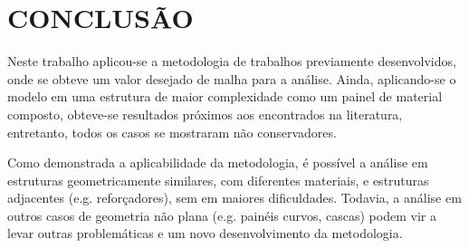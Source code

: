 
\section{CONCLUSÃO}

Neste trabalho aplicou-se a metodologia de trabalhos previamente 
desenvolvidos, onde se obteve um valor desejado de malha para a 
análise.
Ainda, aplicando-se o modelo em uma estrutura de maior complexidade 
como um painel de material composto, obteve-se resultados próximos aos 
encontrados na literatura, entretanto, todos os casos se mostraram não 
conservadores.

Como demonstrada a aplicabilidade da metodologia, é possível a análise em estruturas geometricamente similares, com diferentes materiais, e estruturas adjacentes (e.g. reforçadores), sem em maiores dificuldades. Todavia, a análise em outros casos de geometria não plana (e.g. painéis curvos, cascas) podem vir a levar outras problemáticas e um novo desenvolvimento da metodologia.

